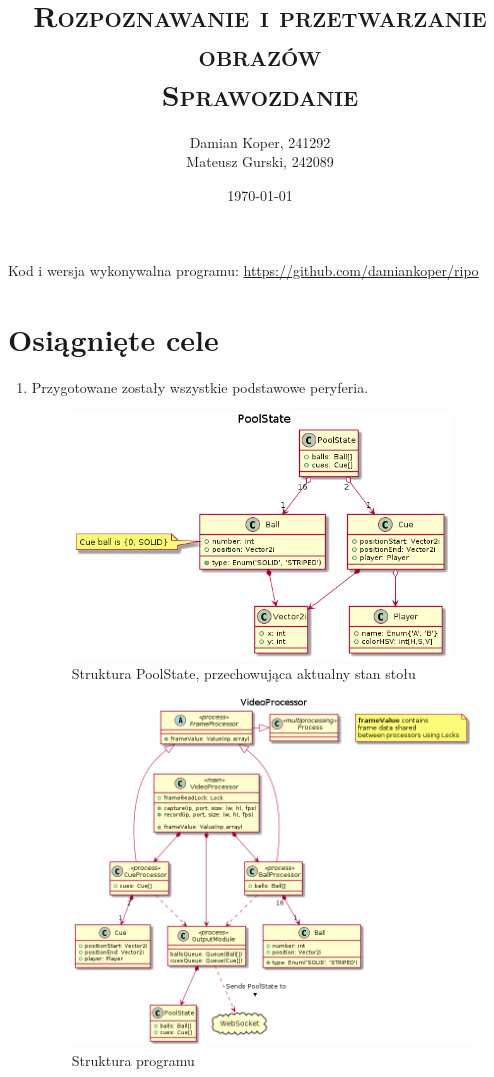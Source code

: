 \documentclass[12pt]{article}
\title{ 
    \vspace*{50mm}
    \textsc{
        \textbf{Rozpoznawanie i przetwarzanie obrazów}\\
        \large Sprawozdanie 
    }
}
\author{
Damian Koper,  241292\\
Mateusz Gurski, 242089
}
\date{\today}
\begin{document}
\maketitle

\newpage
\setcounter{tocdepth}{2}
\localtableofcontents
\listoffigures 
\lstlistoflistings
\vfill
Kod i wersja wykonywalna programu: \url{https://github.com/damiankoper/ripo}
\newpage

\section{Osiągnięte cele}


\begin{enumerate}
    
\item Przygotowane zostały wszystkie podstawowe peryferia. 

\begin{figure}[H]
    \centering
    \includegraphics[width=10cm]{./diagrams/out/pull_state_cd.png}
    \caption{Struktura PoolState, przechowująca aktualny stan stołu}
    \label{}
\end{figure}

\begin{figure}[H]
    \centering
    \includegraphics[width=14cm]{./diagrams/out/video_processor_cd.png}
    \caption{Struktura programu}
    \label{}
\end{figure}


\end{enumerate}
\end{document}
